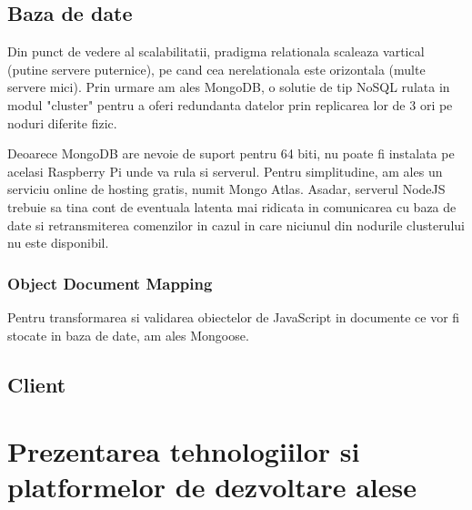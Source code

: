 \subsection {Baza de date}

Din punct de vedere al scalabilitatii, pradigma relationala scaleaza vartical (putine servere puternice), pe cand cea nerelationala este orizontala (multe servere mici). Prin urmare am ales MongoDB, o solutie de tip NoSQL rulata in modul "cluster" pentru a oferi redundanta datelor prin replicarea lor de 3 ori pe noduri diferite fizic.

Deoarece MongoDB are nevoie de suport pentru 64 biti, nu poate fi instalata pe acelasi Raspberry Pi unde va rula si serverul. Pentru simplitudine, am ales un serviciu online de hosting gratis, numit Mongo Atlas. Asadar, serverul NodeJS trebuie sa tina cont de eventuala latenta mai ridicata in comunicarea cu baza de date si retransmiterea comenzilor in cazul in care niciunul din nodurile clusterului nu este disponibil.

\subsubsection {Object Document Mapping}

Pentru transformarea si validarea obiectelor de JavaScript in documente ce vor fi stocate in baza de date, am ales Mongoose.

\subsection {Client}



\section {Prezentarea tehnologiilor si platformelor de dezvoltare alese}
